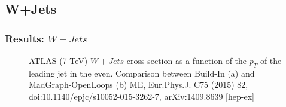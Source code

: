 \documentclass{beamer}
\numberwithin{figure}{section}
\begin{document}
\subsection{W+Jets}
\begin{frame}
 \frametitle{Results: $W+Jets$} 

\begin{figure}[!tbp]
  \centering
  \hfill
  \caption{\scriptsize{ATLAS (7 TeV) $W+Jets$ cross-section as a function of the $p_T$ of the leading jet in the even. Comparison between Build-In (a) and MadGraph-OpenLoops (b) ME,  Eur.Phys.J. C75 (2015) 82, doi:10.1140/epjc/s10052-015-3262-7, arXiv:1409.8639 [hep-ex]}}
\end{figure}
 

\end{frame}

\end{document}
